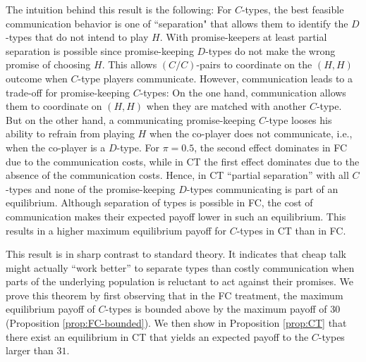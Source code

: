 \documentclass[12pt]{article}
\theoremstyle{break}
\begin{document}
The intuition behind this result is the following: For $C$-types, the best feasible communication behavior is one of ``separation" that allows them to identify the $D$-types that do not intend to play $H$. With promise-keepers at least partial separation is possible since promise-keeping $D$-types do not make the wrong promise of choosing $H$. This allows $(C/C)$-pairs to coordinate on the $(H,H)$ outcome when $C$-type players communicate. However, communication leads to a trade-off for promise-keeping $C$-types: On the one hand, communication allows them to coordinate on $(H,H)$ when they are matched with another $C$-type. But on the other hand, a communicating promise-keeping $C$-type looses his ability to refrain from playing $H$ when the co-player does not communicate, i.e., when the co-player is a $D$-type. For $\pi=0.5$, the second effect dominates in FC due to the communication costs, while in CT the first effect dominates due to the absence of the communication costs. Hence, in CT ``partial separation'' with all $C$-types and none of the promise-keeping $D$-types communicating is part of an equilibrium. Although separation of types is possible in FC, the cost of communication makes their expected payoff lower in such an equilibrium. This results in a higher maximum equilibrium payoff for $C$-types in CT than in FC.

This result is in sharp contrast to standard theory. It indicates that cheap talk might actually ``work better'' to separate types than costly communication when parts of the underlying population is reluctant to act against their promises. We prove this theorem by first observing that in the FC treatment, the maximum equilibrium payoff of $C$-types is bounded above by the maximum payoff of $30$ (Proposition \ref{prop:FC-bounded}). We then show in Proposition \ref{prop:CT} that there exist an equilibrium in CT that yields an expected payoff to the $C$-types larger than $31$. 
\end{document}
